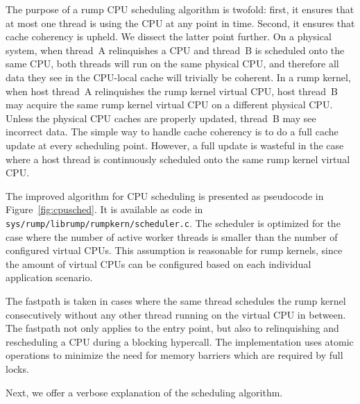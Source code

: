 The purpose of a rump CPU scheduling algorithm is twofold: first,
it ensures that at most one thread is using the CPU at any point
in time.  Second, it ensures that cache coherency is upheld.  We
dissect the latter point further.  On a physical system, when
thread~A relinquishes a CPU and thread~B is scheduled onto the same
CPU, both threads will run on the same physical CPU, and therefore
all data they see in the CPU-local cache will trivially be coherent.
In a rump kernel, when host thread~A relinquishes the rump kernel
virtual CPU, host thread~B may acquire the same rump kernel virtual
CPU on a different physical CPU.  Unless the physical CPU caches are
properly updated, thread~B may see incorrect data.  The simple way
to handle cache coherency is to do a full cache update at every
scheduling point.  However, a full update is wasteful in the case
where a host thread is continuously scheduled onto the same rump kernel
virtual CPU.

The improved algorithm for CPU scheduling is presented as pseudocode
in Figure~\ref{fig:cpusched}.  It is available as code in
\texttt{sys/rump/librump/rumpkern/scheduler.c}.  The scheduler is optimized
for the case where the number of active worker threads is smaller
than the number of configured virtual CPUs.  This assumption is
reasonable for rump kernels, since the amount of virtual CPUs can
be configured based on each individual application scenario.

The fastpath is taken in cases where the same thread schedules the
rump kernel consecutively without any other thread running on the
virtual CPU in between.  The fastpath not only applies to the entry
point, but also to relinquishing and rescheduling a CPU during a blocking
hypercall.  The implementation uses atomic operations to minimize the
need for memory barriers which are required by full locks.

Next, we offer a verbose explanation of the scheduling algorithm.

